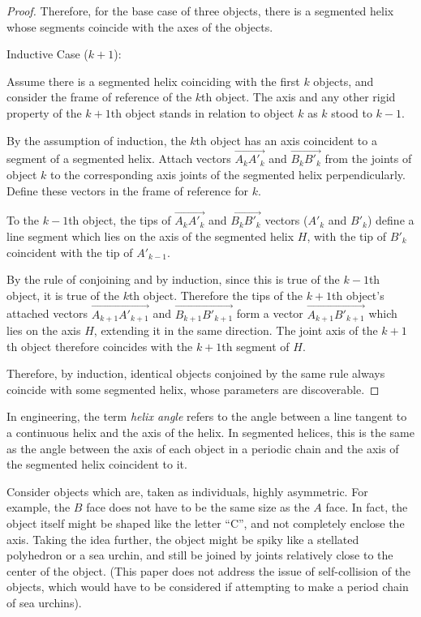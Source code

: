 \documentclass[mathematics,article,submit,pdftex,moreauthors]{Definitions/mdpi}
\begin{document}
\begin{proof}
  Therefore, for the base case of three objects, there is a segmented helix whose
  segments coincide with the axes of the objects.


  Inductive Case ($k+1$):

  Assume there is a segmented helix coinciding with the first $k$ objects, and
  consider the frame of reference of the $k$th object. The axis and any
  other rigid property of the $k+1$th object stands in relation to object $k$
  as $k$ stood to $k-1$.

  By the assumption of induction, the $k$th object has an axis coincident to
  a segment
  of a segmented helix. Attach vectors $\overrightarrow{A_{k}A'_{k}}$ and $\overrightarrow{B_{k}B'_{k}}$
  from the
  joints of object $k$ to the corresponding axis joints of the segmented helix perpendicularly. Define these
  vectors in the frame of reference for $k$.

  To the $k-1$th object, the tips of  $\overrightarrow{A_{k}A'_{k}}$ and $\overrightarrow{B_{k}B'_{k}}$ vectors ($A'_{k}$ and $B'_{k}$) define
  a line segment which lies on the axis of the segmented helix $H$, with the
  tip of $B'_{k}$ coincident with the tip of $A'_{k-1}$.

  By the rule of conjoining and by induction, since this is true of the $k-1$th object,
  it is true of the $k$th object. Therefore the tips of the $k+1$th object's attached vectors
  $\overrightarrow{A_{k+1}A'_{k+1}}$ and $\overrightarrow{B_{k+1}B'_{k+1}}$
  form a vector $\overrightarrow{A_{k+1}B'_{k+1}}$ which lies on the axis $H$, extending it
  in the same direction. The joint axis of the $k+1$th object therefore coincides
  with the $k+1$th segment of $H$.

  Therefore, by induction, identical objects conjoined by the same rule always
  coincide with some segmented helix, whose parameters are discoverable.
\end{proof}

In engineering, the term {\em helix angle} refers
to the angle between a line tangent to a continuous helix and
the axis of the helix. In segmented helices, this is the same
as the angle between the
axis of each object in a periodic chain and the axis of the
segmented helix coincident to it.

Consider
objects which are, taken as individuals, highly asymmetric.
For example,
the $B$ face does not have to be the same size as the $A$ face. In fact,
the object itself might be shaped like the letter ``C'', and not completely
enclose the axis. Taking the idea further, the object might be spiky
like a stellated polyhedron or a sea urchin, and still be joined by
joints relatively close to the center of the object. (This paper does not
address the issue of self-collision of the objects,
which would have to be considered if attempting to make a period chain
of sea urchins).
\end{document}
